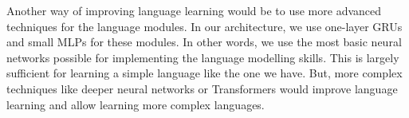 Another way of improving language learning would be to use more advanced techniques for the language modules. In our architecture, we use one-layer GRUs and small MLPs for these modules. In other words, we use the most basic neural networks possible for implementing the language modelling skills. This is largely sufficient for learning a simple language like the one we have. But, more complex techniques like deeper neural networks or Transformers would improve language learning and allow learning more complex languages. 



